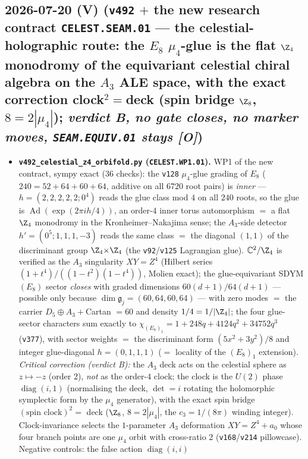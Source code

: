 \documentclass[11pt]{article}
\providecommand{\mO}{\textbf{[O]}}\providecommand{\mX}{\textbf{[X]}}
\providecommand{\cthree}{c_3}\providecommand{\phiz}{\varphi_0^{\mathrm{ret}}}
\begin{document}
\subsection*{2026-07-20 (V) (\texttt{v492} $+$ the new research contract \texttt{CELEST.SEAM.01} --- the celestial-holographic route: the $E_8$ $\mu_4$-glue is the flat $\Z_4$ monodromy of the equivariant celestial chiral algebra on the $A_3$ ALE space, with the exact correction clock$^2{=}$deck (spin bridge $\Z_8$, $8{=}2|\mu_4|$); \emph{verdict B, no gate closes, no marker moves, \texttt{SEAM.EQUIV.01} stays \mO})}
\begin{itemize}[leftmargin=1.5em]
\item \textbf{\texttt{v492\_celestial\_z4\_orbifold.py} (\texttt{CELEST.WP1.01}).} WP1 of the new contract,
sympy exact (36 checks): the \texttt{v128} $\mu_4$-glue grading of $E_8$ ($240=52{+}64{+}60{+}64$, additive on
all $6720$ root pairs) is \emph{inner} --- $h=(2,2,2,2,2;0^4)$ reads the glue class mod $4$ on all $240$
roots, so the glue is $\operatorname{Ad}(\exp(2\pi ih/4))$, an order-$4$ inner torus automorphism $=$ a flat
$\Z_4$ monodromy in the Kronheimer--Nakajima sense; the $A_3$-side detector $h'=(0^5;1,1,1,-3)$ reads the same class $=$ the diagonal
$(1,1)$ of the discriminant group $\Z_4{\times}\Z_4$ (the \texttt{v92}/\texttt{v125} Lagrangian glue).
$\mathbb C^2/\Z_4$ is verified as the $A_3$ singularity $XY{=}Z^4$ (Hilbert series
$(1{+}t^4)/((1{-}t^2)(1{-}t^4))$, Molien exact); the glue-equivariant SDYM$(E_8)$ sector \emph{closes} with
graded dimensions $60(d{+}1)/64(d{+}1)$ --- possible only because $\dim\mathfrak g_j=(60,64,60,64)$ --- with
zero modes $=$ the carrier $D_5{\oplus}A_3{+}$Cartan $=60$ and density $1/4=1/|\Z_4|$; the four glue-sector
characters sum exactly to $\chi_{(E_8)_1}=1{+}248q{+}4124q^2{+}34752q^3$ (\texttt{v377}), with sector weights
$=$ the discriminant form $(5x^2{+}3y^2)/8$ and integer glue-diagonal $h=(0,1,1,1)$ ($=$ locality of the
$(E_8)_1$ extension). \emph{Critical correction (verdict B):} the $A_3$ deck acts on the celestial sphere as
$z\mapsto-z$ (order $2$), \emph{not} as the order-$4$ clock; the clock is the $U(2)$ phase
$\operatorname{diag}(i,1)$ (normalising the deck, $\det=i$ rotating the holomorphic symplectic form by the
$\mu_4$ generator), with the exact spin bridge $(\text{spin clock})^2=$ deck ($\Z_8$, $8=2|\mu_4|$, the
$\cthree=1/(8\pi)$ winding integer). Clock-invariance selects the $1$-parameter $A_3$ deformation
$XY{=}Z^4{+}a_0$ whose four branch points are one $\mu_4$ orbit with cross-ratio $2$
(\texttt{v168}/\texttt{v214} pillowcase). Negative controls: the false action $\operatorname{diag}(i,i)$

\end{itemize}
\end{document}
